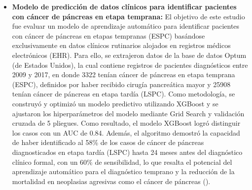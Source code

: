 \begin{itemize}
    \item \textbf{Modelo de predicción de datos clínicos para identificar pacientes con cáncer de páncreas en etapa temprana:} El objetivo de este estudio fue evaluar un modelo de aprendizaje automático para identificar pacientes con cáncer de páncreas en etapas tempranas (ESPC) basándose exclusivamente en datos clínicos rutinarios alojados en registros médicos electrónicos (EHR). Para ello, se extrajeron datos de la base de datos Optum (de Estados Unidos), la cual contiene registros de pacientes diagnósticos entre 2009 y 2017, en donde 3322 tenían cáncer de páncreas en etapa temprana (ESPC), definidos por haber recibido cirugía pancreática mayor y 25908 tenían cáncer de páncreas en etapa tardía (LSPC). Como metodología, se construyó y optimizó un modelo predictivo utilizando XGBoost y se ajustaron los hiperparámetros del modelo mediante Grid Search y validación cruzada de 5 pliegues. Como resultado, el modelo XGBoost logró distinguir los casos con un AUC de 0.84. Además, el algoritmo demostró la capacidad de haber identificado al 58\% de los casos de cáncer de páncreas diagnosticados en etapa tardía (LSPC) hasta 24 meses antes del diagnóstico clínico formal, con un 60\% de sensibilidad, lo que resalta el potencial del aprendizaje automático para el diagnóstico temprano y la reducción de la mortalidad en neoplasias agresivas como el cáncer de páncreas (\cite{article10}).

\end{itemize}
